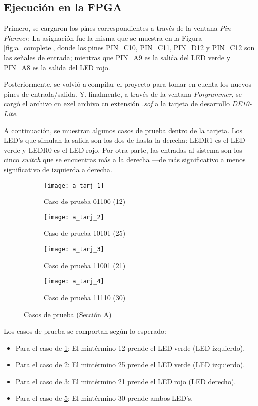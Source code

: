 \documentclass[../procedimientos.tex]{subfiles}
\begin{document}
\subsection{Ejecución en la FPGA}
Primero, se cargaron los pines correspondientes a través de la ventana 
\textit{Pin Planner}. La asignación fue la misma que se muestra en la Figura 
\ref{fig:a_complete}, donde los pines PIN\_C10, PIN\_C11, PIN\_D12 y PIN\_C12 
son las señales de entrada; mientras que PIN\_A9 es la salida del LED verde y 
PIN\_A8 es la salida del LED rojo.

Posteriormente, se volvió a compilar el proyecto para tomar en cuenta los 
nuevos pines de entrada/salida. Y, finalmente, a través de la ventana 
\textit{Porgrammer}, se cargó el archivo cn exel archivo cn extensión 
\textit{.sof} a la tarjeta de desarrollo \textit{DE10-Lite}.

A continuación, se muestran algunos casos de prueba dentro de la tarjeta. Los 
LED's que simulan la salida son los dos de hasta la derecha: LEDR1 es el LED 
verde y LEDR0 es el LED rojo. Por otra parte, las entradas al sistema son los 
cinco \textit{switch} que se encuentras más a la derecha ---de más 
significativo a menos significativo de izquierda a derecha.
\begin{figure}[H]
  \centering
  \begin{subfigure}[b]{0.45\textwidth}
    \centering
    \caption{Caso de prueba 01100 (12)}
    \label{fig:a_tarj_1}
    \texttt{[image: a\_tarj\_1]}
  \end{subfigure}
  \begin{subfigure}[b]{0.45\textwidth}
    \centering
    \caption{Caso de prueba 10101 (25)}
    \label{fig:a_tarj_2}
    \texttt{[image: a\_tarj\_2]}
  \end{subfigure}
  \begin{subfigure}[b]{0.45\textwidth}
    \centering
    \caption{Caso de prueba 11001 (21)}
    \label{fig:a_tarj_3}
    \texttt{[image: a\_tarj\_3]}
  \end{subfigure}
  \begin{subfigure}[b]{0.45\textwidth}
    \centering
    \caption{Caso de prueba 11110 (30)}
    \label{fig:a_tarj_4}
    \texttt{[image: a\_tarj\_4]}
  \end{subfigure}
  \caption{Casos de prueba (Sección A)}
\end{figure}

Los casos de prueba se comportan según lo esperado:
\begin{itemize}
  \item Para el caso de \ref{fig:a_tarj_1}: El mintérmino 12 prende el LED 
    verde (LED izquierdo).
  \item Para el caso de \ref{fig:a_tarj_2}: El mintérmino 25 prende el LED 
    verde (LED izquierdo).
  \item Para el caso de \ref{fig:a_tarj_3}: El mintérmino 21 prende el LED 
    rojo (LED derecho).
  \item Para el caso de \ref{fig:a_tarj_4}: El mintérmino 30 prende ambos 
    LED's.

\end{itemize}
\end{document}
